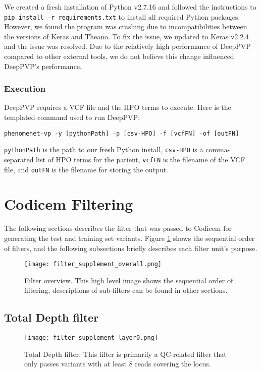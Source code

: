 \documentclass{article}
\begin{document}
We created a fresh installation of Python v2.7.16 and followed the instructions to \texttt{pip install -r requirements.txt} to install all required Python packages. However, we found the program was crashing due to incompatibilities between the versions of Keras and Theano.  To fix the issue, we updated to Keras v2.2.4 and the issue was resolved.  Due to the relatively high performance of DeepPVP compared to other external tools, we do not believe this change influenced DeepPVP's performance.

\subsubsection{Execution}
DeepPVP requires a VCF file and the HPO terms to execute.  Here is the templated command used to run DeepPVP:

\begin{verbatim}
phenomenet-vp -y [pythonPath] -p [csv-HPO] -f [vcfFN] -of [outFN]
\end{verbatim}

\texttt{pythonPath} is the path to our fresh Python install, \texttt{csv-HPO} is a comma-separated list of HPO terms for the patient, \texttt{vcfFN} is the filename of the VCF file, and \texttt{outFN} is the filename for storing the output.

\section{Codicem Filtering}
The following sections describes the filter that was passed to Codicem for generating the test and training set variants.  Figure \ref{fig:filter_overview} shows the sequential order of filters, and the following subsections briefly describes each filter unit's purpose.

\begin{figure}
\centering
\texttt{[image: filter\_supplement\_overall.png]}
\caption{Filter overview.  This high level image shows the sequential order of filtering, descriptions of sub-filters can be found in other sections.}
\label{fig:filter_overview}
\end{figure}

\subsection{Total Depth filter}

\begin{figure}
\centering
\texttt{[image: filter\_supplement\_layer0.png]}
\caption{Total Depth filter.  This filter is primarily a QC-related filter that only passes variants with at least 8 reads covering the locus.}
\label{fig:filter0}
\end{figure}
\end{document}

